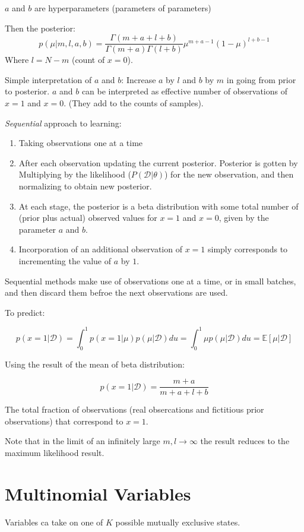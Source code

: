 $a$ and $b$ are hyperparameters (parameters of parameters)

Then the posterior:
\[ p(\mu|m, l, a, b) = \frac{\Gamma(m+a+l+b)}{\Gamma(m+a)\Gamma(l+b)}\mu^{m+a-1} {(1-\mu)}^{l+b-1}\]
Where $l = N - m$ (count of $x = 0$).

Simple interpretation of $a$ and $b$: Increase $a$ by $l$ and $b$ by $m$
in going from prior to posterior. $a$ and $b$ can be interpreted as
effective number of observations of $x=1$ and $x = 0$. (They add to the
counts of samples).

\emph{Sequential} approach to learning:
\begin{enumerate}
    \item Taking observations one at a time
    \item After each observation updating the current posterior.
        Posterior is gotten by Multiplying by the likelihood ($P(\mathcal{D}|\theta)$) for the
        new observation, and then normalizing to obtain new posterior.
    \item At each stage, the posterior is a beta distribution with some
        total number of (prior plus actual) observed values for $x = 1$
        and $x = 0$, given by the parameter $a$ and $b$.
    \item Incorporation of an additional observation of $x = 1$ simply
        corresponds to incrementing the value of $a$ by $1$.
\end{enumerate}

Sequential methods make use of observations one at a time, or in small
batches, and then discard them befroe the next observations are used.

To predict:

\[ p(x = 1|\mathcal{D}) = \int_0^1 p(x = 1|\mu) p(\mu|\mathcal{D}) du =
    \int_0^1 \mu p(\mu|\mathcal{D}) du = \mathbb{E}[\mu|\mathcal{D}]\]

Using the result of the mean of beta distribution:

\begin{equation}
 p(x = 1|\mathcal{D}) = \frac{m+a}{m+a+l+b}
\end{equation}

The total fraction of observations (real obsercations and fictitious prior
observations) that correspond to $x = 1$.

Note that in the limit of an infinitely large $m, l \rightarrow \infty$
the result reduces to the maximum likelihood result.

\section{Multinomial Variables}
Variables ca take on one of $K$ possible mutually exclusive states.

